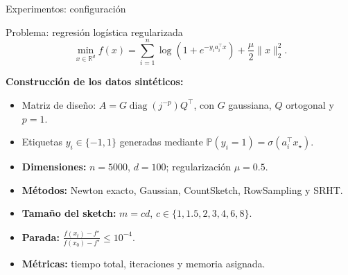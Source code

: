 \documentclass[aspectratio=169,11pt]{beamer}
\begin{document}



\begin{frame}{Experimentos: configuración}
\footnotesize
\setlength{\abovedisplayskip}{3pt}\setlength{\belowdisplayskip}{3pt}

\begin{block}{Problema: regresión logística regularizada}
\[
\min_{x\in\mathbb R^d}
f(x)=\sum_{i=1}^{n}\log(1+e^{-y_i a_i^\top x})
+\frac{\mu}{2}\|x\|_2^2.
\]
\end{block}

\textbf{Construcción de los datos sintéticos:}
\begin{itemize}\setlength{\itemsep}{1pt}
    \item Matriz de diseño:
    $A=G\operatorname{diag}(j^{-p})Q^\top$,
    con $G$ gaussiana, $Q$ ortogonal y $p=1$.
    \item Etiquetas $y_i\in\{-1,1\}$ generadas mediante
    $\mathbb P(y_i=1)=\sigma(a_i^\top x_\star)$.
\end{itemize}

\vspace{0.1cm}
\begin{itemize}\setlength{\itemsep}{1pt}
    \item \textbf{Dimensiones:} $n=5000$, $d=100$;
    regularización $\mu=0.5$.
    \item \textbf{Métodos:} Newton exacto, Gaussian,
    CountSketch, RowSampling y SRHT.
    \item \textbf{Tamaño del sketch:}
    $m=cd$, \quad
    $c\in\{1,1.5,2,3,4,6,8\}$.
    \item \textbf{Parada:}
    $\displaystyle
    \frac{f(x_t)-f^\star}{f(x_0)-f^\star}
    \leq 10^{-4}$.
    \item \textbf{Métricas:} tiempo total, iteraciones
    y memoria asignada.
\end{itemize}

\end{frame}
\end{document}
